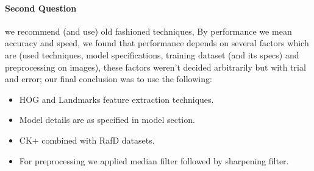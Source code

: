 \paragraph{Second Question}
we recommend (and use) old fashioned techniques, By performance we mean accuracy and speed, we found that performance depends on
several factors which are (used techniques, model specifications, training dataset (and its specs) and preprocessing on images), these factors weren't decided arbitrarily but with trial and error; our final conclusion was to use the following:
\begin{itemize}[noitemsep,nolistsep]
	\item HOG and Landmarks feature extraction techniques.
	\item Model details are as specified in model section.
	\item CK+ combined with RafD datasets.
	\item For preprocessing we applied median filter followed by sharpening filter.
\end{itemize}